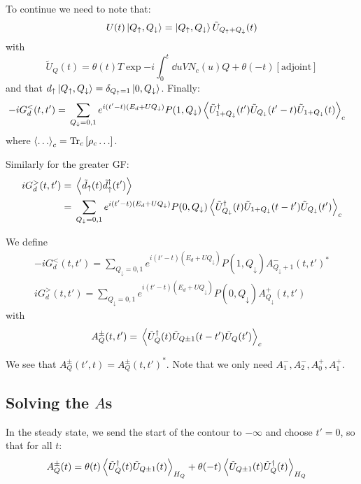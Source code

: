 \documentclass[12pt]{article}
\newcommand\up{\uparrow}
\newcommand\dn{\downarrow}
\begin{document}
To continue we need to note that:
\begin{equation}
	U(t) \ket{Q_\up,Q_\dn} = \ket{Q_\up,Q_\dn} \tilde U_{Q_\up + Q_\dn}(t)
\end{equation}
with
\begin{equation}
	\tilde U_Q(t) = \theta(t) T \exp{-i \int_0^t \dd{u} V N_c(u) Q} + \theta(-t) [\text{adjoint}]
\end{equation}
and that $d_\up \ket{Q_\up,Q_\dn} = \delta_{Q_\up=1} \ket{0, Q_\dn}$.
Finally:
\begin{align}
	-i G^<_d(t, t') ={}& \sum_{Q_\dn=0,1} e^{i(t' - t) (E_d + U Q_\dn)} P(1, Q_\dn)
	\expval{ \tilde U_{1+Q_\dn}^\dagger(t') \tilde U_{Q_\dn}(t' - t) \tilde U_{1 + Q_\dn}(t)}_c
\end{align}
where $\expval{\ldots}_c = \Tr_c \qty[\rho_c \ldots ]$.

Similarly for the greater \ac{GF}:
\begin{align}
	i G^>_d(t, t') ={}& \expval{\tilde d_\up(t) \tilde d_\up^\dagger(t') }
	\\
	={}& \sum_{Q_\dn = 0,1} e^{i(t' - t) (E_d + U Q_\dn)} P(0, Q_\dn)
	\expval{ \tilde U_{Q_\dn}^\dag(t) \tilde U_{1 + Q_\dn}(t - t') \tilde U_{Q_\dn}(t')}_c
\end{align}

We define
\begin{gather}
	-i G^<_d(t, t') = \sum_{Q_\dn=0,1} e^{i(t' - t) (E_d + U Q_\dn)} P(1, Q_\dn) A^-_{Q_\dn + 1}(t, t')^*
	\\
	i G^>_d(t, t') = \sum_{Q_\dn=0,1} e^{i(t' - t) (E_d + U Q_\dn)} P(0, Q_\dn) A^+_{Q_\dn}(t, t')
\end{gather}
with
\begin{align}
	A^{\pm}_{Q}(t, t') ={}& \expval{ \tilde U_{Q}^\dag(t) \tilde U_{Q\pm1}(t - t') \tilde U_{Q}(t')}_c
\end{align}

We see that $A^{\pm}_Q(t', t) = A^{\pm}_Q(t, t')^*$.
Note that we only need $A_1^-, A_2^-, A_0^+, A_1^+$.


\subsection{Solving the $A$s}

In the steady state, we send the start of the contour to $-\infty$ and choose $t' = 0$, so that for all $t$:
\begin{align}
	A^{\pm}_{Q}(t) ={}& \theta(t)\expval{ \tilde U_{Q}^\dag(t) \tilde U_{Q\pm1}(t)}_{H_{Q}} + \theta(-t)\expval{ \tilde U_{Q\pm1}(t) \tilde U_{Q}^\dag(t)}_{H_{Q}}
\end{align}
\end{document}
